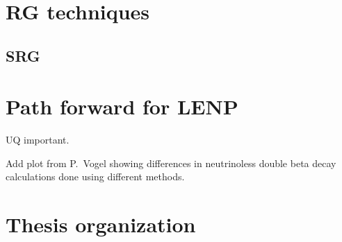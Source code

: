 	\section{RG techniques}

	\subsection{SRG}
	\label{subsec:SRG_intro}



	\section{Path forward for LENP}

	UQ important.

	Add plot from P.\ Vogel showing differences in neutrinoless double beta decay
	calculations done using different methods.  

	\section{Thesis organization}
